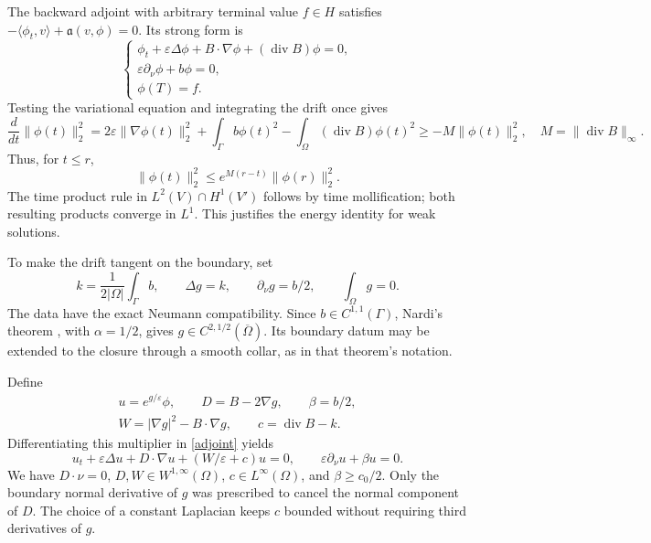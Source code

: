 \documentclass[11pt]{article}
\theoremstyle{remark}
\newcommand{\eps}{\varepsilon}
\newcommand{\divg}{\operatorname{div}}
\begin{document}
The backward adjoint with arbitrary terminal value $f\in H$ satisfies
$-\langle\phi_t,v\rangle+\mathfrak a(v,\phi)=0$. Its strong form is
\begin{equation}\label{adjoint}
 \begin{cases}
 \phi_t+\eps\Delta\phi+B\cdot\nabla\phi+(\divg B)\phi=0,\\
 \eps\partial_\nu\phi+b\phi=0,\\
 \phi(T)=f.
 \end{cases}
\end{equation}
Testing the variational equation and integrating the drift once gives
\begin{equation}\label{energy}
 \frac{d}{dt}\|\phi(t)\|_2^2
 =2\eps\|\nabla\phi(t)\|_2^2+\int_\Gamma b\phi(t)^2
                       -\int_\Omega(\divg B)\phi(t)^2
 \ge-M\|\phi(t)\|_2^2,
 \quad M=\|\divg B\|_\infty.
\end{equation}
Thus, for $t\le r$,
\begin{equation}\label{energy-transfer}
 \|\phi(t)\|_2^2\le e^{M(r-t)}\|\phi(r)\|_2^2.
\end{equation}
The time product rule in $L^2(V)\cap H^1(V')$ follows by time mollification;
both resulting products converge in $L^1$. This justifies the energy identity
for weak solutions.

To make the drift tangent on the boundary, set
\begin{equation}\label{poisson}
 k=\frac1{2|\Omega|}\int_\Gamma b,\qquad
 \Delta g=k,\qquad\partial_\nu g=b/2,\qquad\int_\Omega g=0.
\end{equation}
The data have the exact Neumann compatibility. Since $b\in C^{1,1}(\Gamma)$,
Nardi's theorem \cite[Theorem 3.1]{Nardi}, with $\alpha=1/2$, gives
$g\in C^{2,1/2}(\overline\Omega)$. Its boundary datum may be extended to the
closure through a smooth collar, as in that theorem's notation.

Define
\begin{equation}\label{gauge-coefficients}
 \begin{gathered}
 u=e^{g/\eps}\phi,\qquad D=B-2\nabla g,\qquad \beta=b/2,\\
 W=|\nabla g|^2-B\cdot\nabla g,\qquad c=\divg B-k.
 \end{gathered}
\end{equation}
Differentiating this multiplier in \eqref{adjoint} yields
\begin{equation}\label{gauged}
 u_t+\eps\Delta u+D\cdot\nabla u+(W/\eps+c)u=0,
 \qquad \eps\partial_\nu u+\beta u=0.
\end{equation}
We have $D\cdot\nu=0$, $D,W\in W^{1,\infty}(\Omega)$,
$c\in L^\infty(\Omega)$, and $\beta\ge c_0/2$.
Only the boundary normal derivative of $g$ was prescribed to cancel the normal
component of $D$. The choice of a constant Laplacian keeps $c$ bounded
without requiring third derivatives of $g$.
\end{document}
